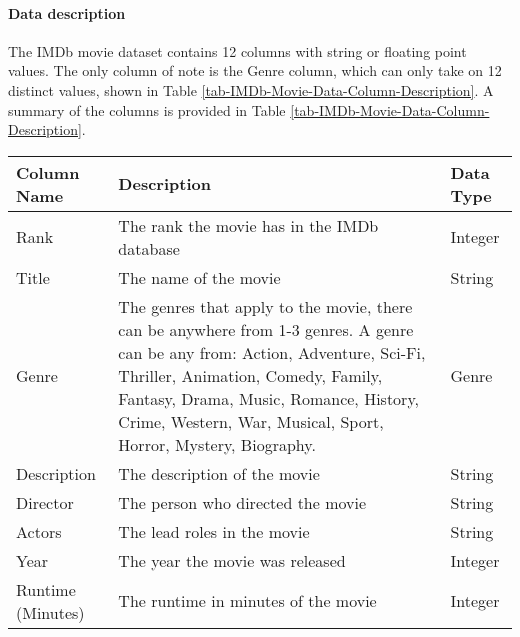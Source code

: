    \paragraph{Data description}
        The IMDb movie dataset contains 12 columns with string or floating point
            values. 
        The only column of note is the Genre column, which can only take on 12 distinct values, 
            shown in Table \ref*{tab-IMDb-Movie-Data-Column-Description}.
        A summary of the columns is provided in Table \ref*{tab-IMDb-Movie-Data-Column-Description}.
        \begin{table}[h]
            \centering
            \begin{tabular}{lp{10cm}l}
                \toprule
                Column Name        & Description                                                                & Data Type \\
                \midrule
                Rank               & The rank the movie has in the IMDb database                                & Integer   \\
                Title              & The name of the movie                                                      & String    \\
                Genre              & The genres that apply to the movie, there can be anywhere from 1-3 genres.
                A genre can be any from: Action, Adventure, Sci-Fi, Thriller, Animation,
                    Comedy, Family, Fantasy, Drama, Music, Romance, History, Crime, Western, War,
                    Musical, Sport, Horror, Mystery, Biography.
                                   & Genre                                                                                  \\
                Description        & The description of the movie                                               & String    \\
                Director           & The person who directed the movie                                          & String    \\
                Actors             & The lead roles in the movie                                                & String    \\
                Year               & The year the movie was released                                            & Integer   \\
                Runtime (Minutes)  & The runtime in minutes of the movie                                        & Integer   \\

\end{tabular}
\end{table}
